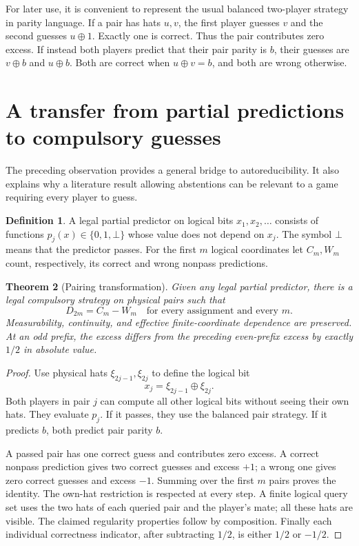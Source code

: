 \documentclass[11pt,letterpaper]{article}
\newtheorem{theorem}{Theorem}[section]
\theoremstyle{definition}
\newtheorem{definition}[theorem]{Definition}
\newcommand{\xor}{\mathbin{\oplus}}
\begin{document}
For later use, it is convenient to represent the usual balanced
two-player strategy in parity language. If a pair has hats \(u,v\),
the first player guesses \(v\) and the second guesses \(u\xor1\).
Exactly one is correct. Thus the pair contributes zero excess.
If instead both players predict that their pair parity is \(b\), their
guesses are \(v\xor b\) and \(u\xor b\). Both are correct when
\(u\xor v=b\), and both are wrong otherwise.

\section{A transfer from partial predictions to compulsory guesses}
\label{mbg:hat:sec:transfer}

The preceding observation provides a general bridge to autoreducibility.
It also explains why a literature result allowing abstentions can be
relevant to a game requiring every player to guess.

\begin{definition}
A legal partial predictor on logical bits \(x_1,x_2,\ldots\) consists
of functions \(p_j(x)\in\{0,1,\bot\}\) whose value does not depend on
\(x_j\). The symbol \(\bot\) means that the predictor passes.
For the first \(m\) logical coordinates let \(C_m,W_m\) count,
respectively, its correct and wrong nonpass predictions.
\end{definition}

\begin{theorem}[Pairing transformation]\label{mbg:hat:thm:transfer}
Given any legal partial predictor, there is a legal compulsory
strategy on physical pairs such that
\[
  D_{2m}=C_m-W_m
  \quad\text{for every assignment and every }m.
\]
Measurability, continuity, and effective finite-coordinate dependence
are preserved. At an odd prefix, the excess differs from the preceding
even-prefix excess by exactly \(1/2\) in absolute value.
\end{theorem}
\begin{proof}
Use physical hats \(\xi_{2j-1},\xi_{2j}\) to define the logical bit
\[
  x_j=\xi_{2j-1}\xor\xi_{2j}.
\]
Both players in pair \(j\) can compute all other logical bits without
seeing their own hats. They evaluate \(p_j\).
If it passes, they use the balanced pair strategy. If it predicts
\(b\), both predict pair parity \(b\).

A passed pair has one correct guess and contributes zero excess.
A correct nonpass prediction gives two correct guesses and excess
\(+1\); a wrong one gives zero correct guesses and excess \(-1\).
Summing over the first \(m\) pairs proves the identity. The own-hat
restriction is respected at every step. A finite logical query set
uses the two hats of each queried pair and the player's mate; all
these hats are visible. The claimed regularity properties follow
by composition. Finally each individual correctness indicator,
after subtracting \(1/2\), is either \(1/2\) or \(-1/2\).
\end{proof}
\end{document}
